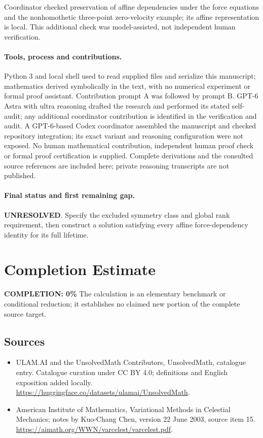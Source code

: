 \documentclass[11pt]{article}
\begin{document}
Coordinator checked preservation of affine dependencies under the force equations and the nonhomothetic three-point zero-velocity example; its affine representation is local. This additional check was model-assisted, not independent human verification.

\paragraph{Tools, process and contributions.}
Python 3 and local shell used to read supplied files and serialize this manuscript; mathematics derived symbolically in the text, with no numerical experiment or formal proof assistant. Contribution prompt A was followed by prompt B. GPT-6 Astra with ultra reasoning drafted the research and performed its stated self-audit; any additional coordinator contribution is identified in the verification and audit. A GPT-6-based Codex coordinator assembled the manuscript and checked repository integration; its exact variant and reasoning configuration were not exposed. No human mathematical contribution, independent human proof check or formal proof certification is supplied. Complete derivations and the consulted source references are included here; private reasoning transcripts are not published.

\paragraph{Final status and first remaining gap.}
\textbf{UNRESOLVED}. Specify the excluded symmetry class and global rank requirement, then construct a solution satisfying every affine force-dependency identity for its full lifetime.

\section{Completion Estimate}
\noindent\textbf{COMPLETION: 0\%}
The calculation is an elementary benchmark or conditional reduction; it establishes no claimed new portion of the complete source target.

\subsection{Sources}
\begin{itemize}
\item[\hypertarget{source:statement:1}{S1}] ULAM.AI and the UnsolvedMath Contributors, UnsolvedMath, catalogue entry. Catalogue curation under CC BY 4.0; definitions and English exposition added locally.
\url{https://huggingface.co/datasets/ulamai/UnsolvedMath}.
\item[\hypertarget{source:statement:2}{S2}] American Institute of Mathematics, Variational Methods in Celestial Mechanics; notes by Kuo-Chang Chen, version 22 June 2003, source item 15.
\url{https://aimath.org/WWN/varcelest/varcelest.pdf}.
\end{itemize}
\label{end:statement}
\end{document}
